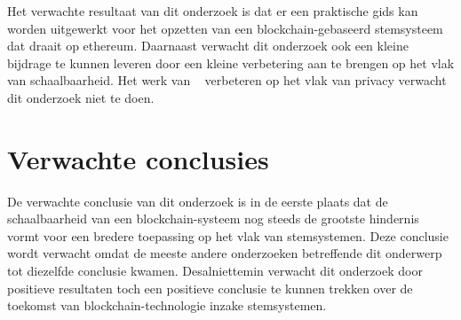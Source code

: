 Het verwachte resultaat van dit onderzoek is dat er een praktische gids kan worden uitgewerkt voor het opzetten van een blockchain-gebaseerd stemsysteem dat draait op ethereum. Daarnaast verwacht dit onderzoek ook een kleine bijdrage te kunnen leveren door een kleine verbetering aan te brengen op het vlak van schaalbaarheid. Het werk van ~\textcite{McCorry2017} verbeteren op het vlak van privacy verwacht dit onderzoek niet te doen. 

\section{Verwachte conclusies}
\label{sec:verwachte_conclusies}

De verwachte conclusie van dit onderzoek is in de eerste plaats dat de schaalbaarheid van een blockchain-systeem nog steeds de grootste hindernis vormt voor een bredere toepassing op het vlak van stemsystemen. Deze conclusie wordt verwacht omdat de meeste andere onderzoeken betreffende dit onderwerp tot diezelfde conclusie kwamen. Desalniettemin verwacht dit onderzoek door positieve resultaten toch een positieve conclusie te kunnen trekken over de toekomst van blockchain-technologie inzake stemsystemen.

